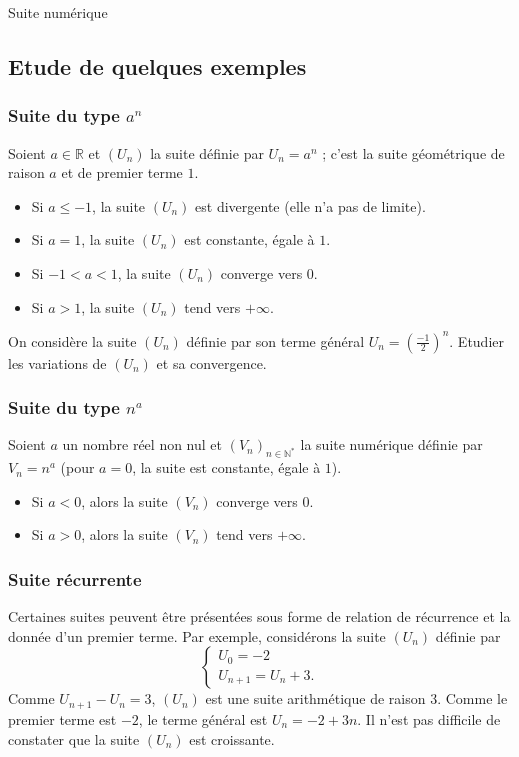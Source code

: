 \begin{chapter}{Suite num\'erique}
\subsection{Etude de quelques exemples}
%
\subsubsection{Suite du type $a^n$}
%
Soient $a \in \mathbb{R}$ et $(U_n)$ la suite d\'efinie par $U_n = a^n$ ; c'est la suite g\'eom\'etrique de raison $a$ et de premier terme $1$.
\begin{itemize} 
\item Si $a \leq -1$, la suite $(U_n)$ est divergente (elle n'a pas de limite).
\item Si $a = 1$, la suite $(U_n)$ est constante, \'egale \`a $1$.
\item Si $-1 < a < 1$, la suite $(U_n)$ converge vers $0$.
\item Si $a > 1$, la suite $(U_n)$ tend vers $+ \infty$.
\end{itemize}
\begin{exe}\label{exe:suite-3}
\label{exe:-1/2 ^n}
On consid\`ere la suite $(U_n)$ d\'efinie par son terme g\'en\'eral $U_n = \left( \frac{-1}{2} \right)^n$.
Etudier les variations de $(U_n)$ et sa convergence.

\end{exe}
%
\subsubsection{Suite du type $n^a$}
%
Soient $a$ un nombre r\'eel non nul et $(V_n)_{n \in \mathbb{N}^*}$ la suite num\'erique d\'efinie par $V_n = n^a$
(pour $a = 0$, la suite est constante, \'egale \`a $1$).
\begin{itemize} 
\item Si $a < 0$, alors la suite $(V_n)$ converge vers $0$.
\item Si $a > 0$, alors la suite $(V_n)$ tend vers $+\infty$.
\end{itemize}
%
\subsubsection{Suite r\'ecurrente}
%
Certaines suites peuvent \^etre pr\'esent\'ees sous forme de relation de r\'ecurrence et la donn\'ee d'un premier terme.
Par exemple, consid\'erons la suite $(U_n)$ d\'efinie par 
\[
\left\lbrace
\begin{array}{l}
U_0 = -2 \\
U_{n+1} = U_n + 3 .
\end{array}
\right.
\]
Comme $U_{n+1} - U_n = 3$, $(U_n)$ est une suite arithm\'etique de raison $3$.
Comme le premier terme est $-2$, le terme g\'en\'eral est $U_n = -2 + 3n$.
Il n'est pas difficile de constater que la suite $(U_n)$ est croissante.


\end{chapter}
